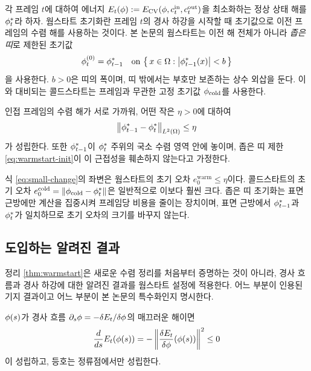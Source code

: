 각 프레임 $t$에 대하여 에너지 $E_t(\phi) := E_{\mathrm{CV}}(\phi,c^{\mathrm{in}}_t,c^{\mathrm{out}}_t)$을 최소화하는 정상
상태 해를 $\phi^*_t$라 하자. 웜스타트 초기화란 프레임 $t$의 경사 하강을 시작할 때
초기값으로 이전 프레임의 수렴 해를 사용하는 것이다. 본 논문의 웜스타트는 이전 해
전체가 아니라 \emph{좁은 띠}로 제한된 초기값
\begin{equation}
  \phi^{(0)}_t = \phi^*_{t-1}
  \quad \text{on } \bigl\{\, x \in \Omega : \left\lvert \phi^*_{t-1}(x) \right\rvert < b \,\bigr\}
  \label{eq:warmstart-init}
\end{equation}
을 사용한다. $b>0$은 띠의 폭이며, 띠 밖에서는 부호만 보존하는 상수 외삽을 둔다.
이와 대비되는 콜드스타트는 프레임과 무관한 고정 초기값 $\phi_{\mathrm{cold}}$를
사용한다.

\begin{assumption}[작은 변화 가정]
\label{ass:small-change}
인접 프레임의 수렴 해가 서로 가까워, 어떤 작은 $\eta>0$에 대하여
\begin{equation}
  \left\lVert \phi^*_{t-1} - \phi^*_t \right\rVert_{L^2(\Omega)} \le \eta
  \label{eq:small-change}
\end{equation}
가 성립한다. 또한 $\phi^*_{t-1}$이 $\phi^*_t$ 주위의 국소 수렴 영역 안에 놓이며,
좁은 띠 제한 \eqref{eq:warmstart-init}이 이 근접성을 훼손하지 않는다고 가정한다.
\end{assumption}

식 \eqref{eq:small-change}의 좌변은 웜스타트의 초기 오차
$e^{\mathrm{warm}}_0 \le \eta$이다. 콜드스타트의 초기 오차
$e^{\mathrm{cold}}_0 = \left\lVert \phi_{\mathrm{cold}}-\phi^*_t \right\rVert$은 일반적으로 이보다
훨씬 크다. 좁은 띠 초기화는 표면 근방에만 계산을 집중시켜 프레임당 비용을 줄이는
장치이며, 표면 근방에서 $\phi^*_{t-1}$과 $\phi^*_t$가 일치하므로 초기 오차의 크기를
바꾸지 않는다.

\subsection{도입하는 알려진 결과}

정리 \ref{thm:warmstart}은 새로운 수렴 정리를 처음부터 증명하는 것이 아니라, 경사
흐름과 경사 하강에 대한 알려진 결과를 웜스타트 설정에 적용한다. 어느 부분이 인용된
기지 결과이고 어느 부분이 본 논문의 특수화인지 명시한다.

\begin{lemma}
\label{lem:dissipation}
$\phi(s)$가 경사 흐름 $\partial_s\phi = -\delta E_t/\delta\phi$의 매끄러운 해이면
\begin{equation}
  \frac{d}{ds}E_t(\phi(s))
  = -\left\lVert \frac{\delta E_t}{\delta \phi}(\phi(s)) \right\rVert^2 \le 0
  \label{eq:dissipation}
\end{equation}
이 성립하고, 등호는 정류점에서만 성립한다.
\end{lemma}

